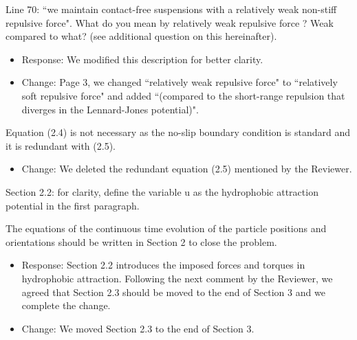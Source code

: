 \documentclass[11pt]{article}
\newcommand{\comment}[1]{{\color{blue} #1}}
\begin{document}
\noindent
\comment{Line 70: ``we maintain contact-free suspensions with a
relatively weak non-stiff repulsive force". What do you mean by
relatively weak repulsive force ? Weak compared to what? (see additional
question on this hereinafter).}
\begin{itemize}
  \item Response: We modified this description for better clarity.
  \item Change: Page 3, we changed ``relatively weak repulsive force" to ``relatively soft repulsive force" and added ``(compared to the short-range repulsion that diverges in the Lennard-Jones potential)".
  
\end{itemize}

\noindent
\comment{Equation (2.4) is not necessary as the no-slip boundary
condition is standard and it is redundant with (2.5).}
\begin{itemize}
  \item Change: We deleted the redundant equation (2.5) mentioned by the Reviewer.
\end{itemize}

\noindent
\comment{Section 2.2: for clarity, define the variable u as the
hydrophobic attraction potential in the first paragraph.}

\noindent
\comment{The equations of the continuous time evolution of the particle
positions and orientations should be written in Section 2 to close the
problem.}
\begin{itemize}
\item Response: Section 2.2 introduces the imposed forces and torques in hydrophobic attraction.
  Following the next comment by 
the Reviewer, we agreed that Section 2.3 should be moved to the end of Section 3 and we complete the change.
\item Change: We moved Section 2.3 to the end of Section 3.
\end{itemize}
\end{document}
